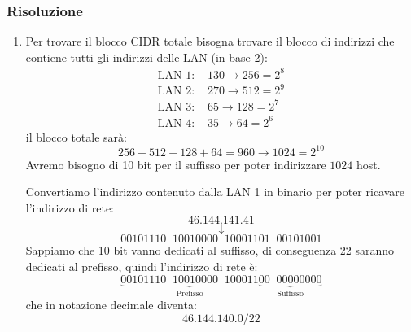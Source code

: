 \documentclass[a4paper]{article}
\begin{document}
\subsubsection{Risoluzione}
\begin{enumerate}
  \item 
    Per trovare il blocco CIDR totale bisogna trovare il blocco di indirizzi che
    contiene tutti gli indirizzi delle LAN (in base 2):
    \[
      \begin{aligned}
        \text{LAN 1: } & 130 \to 256 = 2^8\\
        \text{LAN 2: } & 270 \to 512 = 2^9\\
        \text{LAN 3: } & 65 \to 128 = 2^7\\
        \text{LAN 4: } & 35 \to 64 = 2^6
      \end{aligned}
    \] 
    il blocco totale sarà:
    \[
      256 + 512 + 128 + 64 = 960 \to 1024 = 2^{10}
    \] 
    Avremo bisogno di 10 bit per il suffisso per poter indirizzare \( 1024 \) host.

    \vspace{1em}
    \noindent
    Convertiamo l'indirizzo contenuto dalla LAN 1 in binario per poter ricavare l'indirizzo
    di rete:
    \[
      46.144.141.41
    \] 
    \[
      \downarrow
    \] 
    \[
      00101110 \;\; 10010000 \;\; 10001101 \;\; 00101001
    \] 
    Sappiamo che 10 bit vanno dedicati al suffisso, di conseguenza 22 saranno dedicati al
    prefisso, quindi l'indirizzo di rete è: 
    \[
      \underbrace{00101110 \;\; 10010000 \;\; 100011}_{\text{Prefisso}}
      \underbrace{00 \;\; 00000000}_{\text{Suffisso}}
    \] 
    che in notazione decimale diventa:
    \[
      46.144.140.0/22
    \] 


\end{enumerate}
\end{document}
